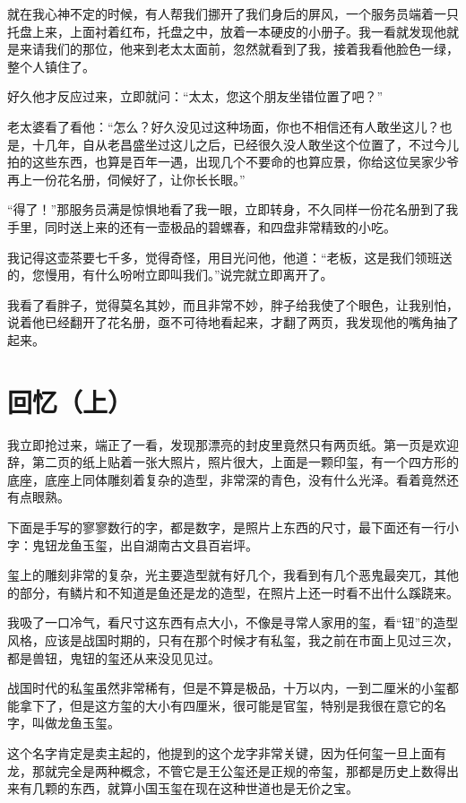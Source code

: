 就在我心神不定的时候，有人帮我们挪开了我们身后的屏风，一个服务员端着一只托盘上来，上面衬着红布，托盘之中，放着一本硬皮的小册子。我一看就发现他就是来请我们的那位，他来到老太太面前，忽然就看到了我，接着我看他脸色一绿，整个人镇住了。

好久他才反应过来，立即就问：“太太，您这个朋友坐错位置了吧？”

老太婆看了看他：“怎么？好久没见过这种场面，你也不相信还有人敢坐这儿？也是，十几年，自从老昌盛坐过这儿之后，已经很久没人敢坐这个位置了，不过今儿拍的这些东西，也算是百年一遇，出现几个不要命的也算应景，你给这位吴家少爷再上一份花名册，伺候好了，让你长长眼。”

“得了！”那服务员满是惊惧地看了我一眼，立即转身，不久同样一份花名册到了我手里，同时送上来的还有一壶极品的碧螺春，和四盘非常精致的小吃。

我记得这壶茶要七千多，觉得奇怪，用目光问他，他道：“老板，这是我们领班送的，您慢用，有什么吩咐立即叫我们。”说完就立即离开了。

我看了看胖子，觉得莫名其妙，而且非常不妙，胖子给我使了个眼色，让我别怕，说着他已经翻开了花名册，亟不可待地看起来，才翻了两页，我发现他的嘴角抽了起来。

\chapter{回忆（上）}

我立即抢过来，端正了一看，发现那漂亮的封皮里竟然只有两页纸。第一页是欢迎辞，第二页的纸上贴着一张大照片，照片很大，上面是一颗印玺，有一个四方形的底座，底座上同体雕刻着复杂的造型，非常深的青色，没有什么光泽。看着竟然还有点眼熟。

下面是手写的寥寥数行的字，都是数字，是照片上东西的尺寸，最下面还有一行小字：鬼钮龙鱼玉玺，出自湖南古文县百岩坪。

玺上的雕刻非常的复杂，光主要造型就有好几个，我看到有几个恶鬼最突兀，其他的部分，有鳞片和不知道是鱼还是龙的造型，在照片上还一时看不出什么蹊跷来。

我吸了一口冷气，看尺寸这东西有点大小，不像是寻常人家用的玺，看“钮”的造型风格，应该是战国时期的，只有在那个时候才有私玺，我之前在市面上见过三次，都是兽钮，鬼钮的玺还从来没见见过。

战国时代的私玺虽然非常稀有，但是不算是极品，十万以内，一到二厘米的小玺都能拿下了，但是这方玺的大小有四厘米，很可能是官玺，特别是我很在意它的名字，叫做龙鱼玉玺。

这个名字肯定是卖主起的，他提到的这个龙字非常关键，因为任何玺一旦上面有龙，那就完全是两种概念，不管它是王公玺还是正规的帝玺，那都是历史上数得出来有几颗的东西，就算小国玉玺在现在这种世道也是无价之宝。

